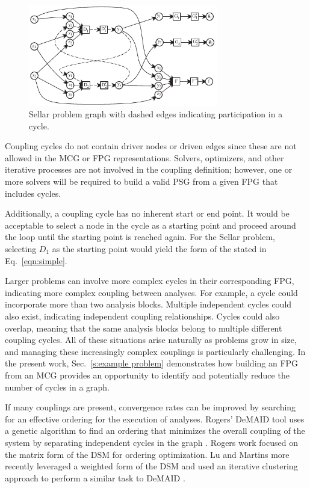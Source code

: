   \begin{figure}[htb!]
    \begin{center}
      \includegraphics[width=3.25in]{images/sellar_cycles}
    \end{center}
    \caption{Sellar problem graph with dashed edges indicating %
    participation in a cycle.\label{f:sellar cycles}}
  \end{figure} 

  Coupling cycles do not contain driver nodes or driven edges since these 
  are not allowed in the MCG or FPG representations. 
  Solvers, optimizers, and other iterative processes are not involved in the coupling 
  definition; however, one or more solvers will be required to build a valid PSG from a 
  given FPG  that includes cycles. 
  
  Additionally, a coupling cycle has no inherent 
  start or end point. It would be acceptable to select a
  node in the cycle as a starting point and proceed around the
  loop until the starting point is reached again. For the Sellar problem, selecting 
  $D_1$ as the starting point would yield the form of the stated in 
  Eq.~\ref{eqn:simple}.
  
  Larger problems can involve more complex cycles in their corresponding FPG, indicating more 
  complex coupling between analyses. For example, a cycle could incorporate more than 
   two analysis blocks. Multiple independent cycles could also exist, indicating 
  independent coupling relationships. Cycles could also overlap, meaning that the same analysis 
  blocks belong to multiple different coupling cycles. All of these situations
  arise naturally as problems grow in size, and managing these increasingly complex  couplings is particularly challenging. 
  In the present work, Sec.~\ref{s:example problem}
  demonstrates how building an FPG from an MCG provides an opportunity to 
  identify and potentially reduce the number of cycles in a graph. 

  If many couplings are present, convergence rates can be improved by 
  searching for an effective ordering for the execution of analyses.
  Rogers' DeMAID tool uses a genetic algorithm to find an ordering that minimizes 
  the overall coupling of the system by separating independent cycles in the 
  graph \cite{rogers1996,rogers1996demaid}. Rogers work focused on the matrix 
  form of the DSM for ordering optimization. Lu and Martins more recently leveraged 
  a weighted form of the DSM and used an iterative clustering approach to perform a 
  similar task to DeMAID \cite{Lu2012}.

